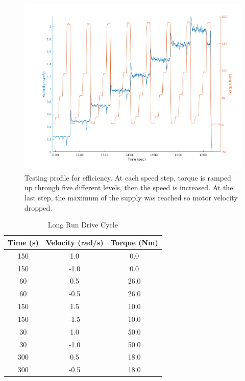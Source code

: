 \documentclass[letterpaper, 10 pt, conference]{ieeeconf}  %
\begin{document}
   \begin{figure}[!b]
      \centering
      \includegraphics[width=\linewidth]{eff_test_profile_v3}
      \caption{Testing profile for efficiency. At each speed step, torque is ramped up through five different levels, then the speed is increased. At the last step, the maximum of the supply was reached so motor velocity dropped.}
      \label{eff_profile}
   \end{figure}

\begin{table}[h]
\caption{Long Run Drive Cycle}
\label{table_2}
\begin{center}
\begin{tabular}{|c||c||c|}
\hline
Time (s) & Velocity (rad/s) & Torque (Nm)\\
\hline
150 & 1.0 & 0.0\\
\hline
150 & -1.0 & 0.0\\
\hline
60 & 0.5 & 26.0\\
\hline
60 & -0.5 & 26.0\\
\hline
150 & 1.5 & 10.0\\
\hline
150 & -1.5 & 10.0\\
\hline
30 & 1.0 & 50.0\\
\hline
30 & -1.0 & 50.0\\
\hline
300 & 0.5 & 18.0\\
\hline
300 & -0.5 & 18.0\\
\hline
\end{tabular}
\end{center}
\end{table}
\end{document}
